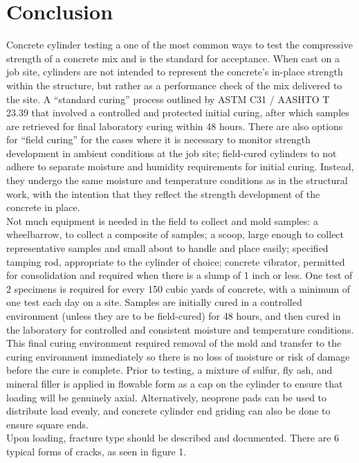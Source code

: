 \documentclass{article}
\begin{document}
    \section{Conclusion}
    \indent Concrete cylinder testing a one of the most common ways to test the compressive strength of a concrete mix and is the standard for acceptance. When cast on a job site, cylinders are not intended to represent the concrete’s in-place strength within the structure, but rather as a performance check of the mix delivered to the site. A “standard curing” process outlined by ASTM C31 / AASHTO T 23.39 that involved a controlled and protected initial curing, after which samples are retrieved for final laboratory curing within 48 hours.  There are also options for ``field curing'' for the cases where it is necessary to monitor strength development in ambient conditions at the job site; field-cured cylinders to not adhere to separate moisture and humidity requirements for initial curing. Instead, they undergo the same moisture and temperature conditions as in the structural work, with the intention that they reflect the strength development of the concrete in place.\\ 
    \indent Not much equipment is needed in the field to collect and mold samples: a wheelbarrow, to collect a composite of samples; a scoop, large enough to collect representative samples and small about to handle and place easily; specified tamping rod, appropriate to the cylinder of choice; concrete vibrator, permitted for consolidation and required when there is a slump of 1 inch or less. One test of 2 specimens is required for every 150 cubic yards of concrete, with a minimum of one test each day on a site. 
    Samples are initially cured in a controlled environment (unless they are to be field-cured) for 48 hours, and then cured in the laboratory for controlled and consistent moisture and temperature conditions. This final curing environment required removal of the mold and transfer to the curing environment immediately so there is no loss of moisture or risk of damage before the cure is complete. Prior to testing, a mixture of sulfur, fly ash, and mineral filler is applied in flowable form as a cap on the cylinder to ensure that loading will be genuinely axial. Alternatively, neoprene pads can be used to distribute load evenly, and concrete cylinder end griding can also be done to ensure square ends. \\
    \indent Upon loading, fracture type should be described and documented. There are 6 typical forms of cracks, as seen in figure 1. \\
\end{document}
